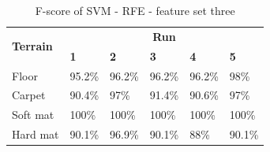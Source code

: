 \documentclass[USenglish]{ifimaster}  %
\begin{document}
\begin{table}[h]\ContinuedFloat
	\begin{subtable}[h]{1\textwidth}
		\centering
		\captionsetup{justification=centering}
		\begin{tabular}{@{}llllll@{}}
			\toprule
			\multirow{2}{*}{\textbf{Terrain}} & \multicolumn{5}{c}{\textbf{Run}} \\ \cmidrule(l){2-6} 
			& \multicolumn{1}{l|}{\textbf{1}} & \multicolumn{1}{l|}{\textbf{2}} & \multicolumn{1}{l|}{\textbf{3}} & \multicolumn{1}{l|}{\textbf{4}} & \textbf{5} \\ \midrule
			\multicolumn{1}{l|}{Floor} & \multicolumn{1}{l|}{95.2\%} & \multicolumn{1}{l|}{96.2\%} & \multicolumn{1}{l|}{96.2\%} & \multicolumn{1}{l|}{96.2\%} & 98\% \\ \midrule
			\multicolumn{1}{l|}{Carpet} & \multicolumn{1}{l|}{90.4\%} & \multicolumn{1}{l|}{97\%} & \multicolumn{1}{l|}{91.4\%} & \multicolumn{1}{l|}{90.6\%} & 97\% \\ \midrule
			\multicolumn{1}{l|}{Soft mat} & \multicolumn{1}{l|}{100\%} & \multicolumn{1}{l|}{100\%} & \multicolumn{1}{l|}{100\%} & \multicolumn{1}{l|}{100\%} & 100\% \\ \midrule
			\multicolumn{1}{l|}{Hard mat} & \multicolumn{1}{l|}{90.1\%} & \multicolumn{1}{l|}{96.9\%} & \multicolumn{1}{l|}{90.1\%} & \multicolumn{1}{l|}{88\%} & 90.1\% \\ \bottomrule
		\end{tabular}
		\caption{F-score of SVM - RFE - feature set three}
		\label{fscoresvm}
	\end{subtable}
\end{table}
\end{document}

